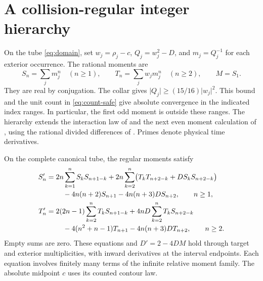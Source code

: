 \section{A collision-regular integer hierarchy}
\label{sec:integer}

On the tube \eqref{eq:domain}, set \(w_j=\rho_j-c\), \(Q_j=w_j^2-D\),
and \(m_j=Q_j^{-1}\) for each exterior occurrence. The rational
moments are
\[
 S_n=\sum_j m_j^n\quad(n\geq 1),\qquad
 T_n=\sum_j w_jm_j^n\quad(n\geq 2),\qquad M=S_1 .
\]
They are real by conjugation. The collar gives
\(\lvert Q_j\rvert\geq(15/16)\lvert w_j\rvert^2\). This bound and the
unit count in \eqref{eq:count-safe} give absolute convergence in the
indicated index ranges. In particular, the first odd moment is outside
these ranges. The hierarchy extends the interaction law
of \cite{BakerGT41} and the next even moment calculation of
\cite{BakerGR02}, using the rational divided differences of
\cite{BakerCM09}. Primes denote physical time derivatives.

\begin{theorem}\label{thm:hierarchy}
On the complete canonical tube, the regular moments satisfy
\begin{align}
 S_n'={}&2n\sum_{k=1}^{n}S_kS_{n+1-k}
       +2n\sum_{k=2}^{n}\bigl(T_kT_{n+2-k}+DS_kS_{n+2-k}\bigr)
       \notag\\[-1pt]
       &\quad-4n(n+2)S_{n+1}-4n(n+3)DS_{n+2},
       \qquad n\geq1, \label{eq:S-hierarchy}\\
 T_n'={}&2(2n-1)\sum_{k=2}^{n}T_kS_{n+1-k}
       +4nD\sum_{k=2}^{n}T_kS_{n+2-k}
       \notag\\[-1pt]
       &\quad-4(n^2+n-1)T_{n+1}-4n(n+3)DT_{n+2},
       \qquad n\geq2. \label{eq:T-hierarchy}
\end{align}
Empty sums are zero. These equations and \(D'=2-4DM\) hold through
target and exterior multiplicities, with inward derivatives at the
interval endpoints. Each equation involves finitely many terms of the
infinite relative moment family. The absolute midpoint \(c\) uses
its counted contour law.
\end{theorem}


